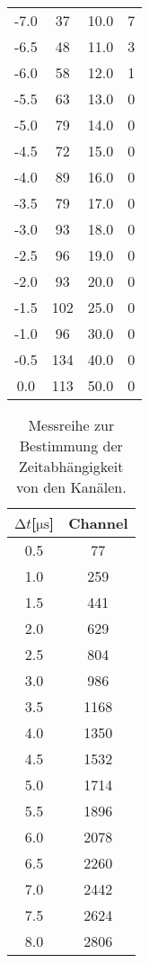 \begin{table}
\begin{tabular}{c c || c c}
        -7.0     &   37     &    10.0      &   7    \\
        -6.5   &   48     &    11.0      &   3    \\
        -6.0     &   58     &    12.0      &   1    \\
        -5.5   &   63     &    13.0      &   0    \\
        -5.0     &   79     &    14.0      &   0    \\
        -4.5   &   72     &    15.0      &   0    \\
        -4.0     &   89     &    16.0      &   0    \\
        -3.5   &   79     &    17.0      &   0    \\
        -3.0     &   93     &    18.0      &   0    \\
        -2.5   &   96     &    19.0      &   0    \\
        -2.0     &   93     &    20.0      &   0    \\
        -1.5   &   102    &    25.0      &   0    \\
        -1.0     &   96     &    30.0      &   0    \\
        -0.5   &   134    &    40.0      &   0    \\
        0.0      &   113    &       50.0   &   0    \\
    \end{tabular}
\end{table}
 
\begin{table}
    \centering
    \caption{Messreihe zur Bestimmung der Zeitabhängigkeit von den Kanälen.} 
    \label{tab:1122332211}
    \begin{tabular}{c c}
        \toprule
        $\increment t$[$\si{\micro\second}$] & Channel \\
        \midrule
        0.5   &  77\\
        1.0     &  259\\ 
        1.5   &  441\\
        2.0     &  629\\
        2.5   &  804\\
        3.0     &  986\\
        3.5   &  1168\\
        4.0     &  1350\\
        4.5   &  1532\\
        5.0     &  1714\\
        5.5   &  1896\\
        6.0     &  2078\\
        6.5   &  2260\\
        7.0     &  2442\\
        7.5   &  2624\\
        8.0     &  2806\\
    \end{tabular}
\end{table}


